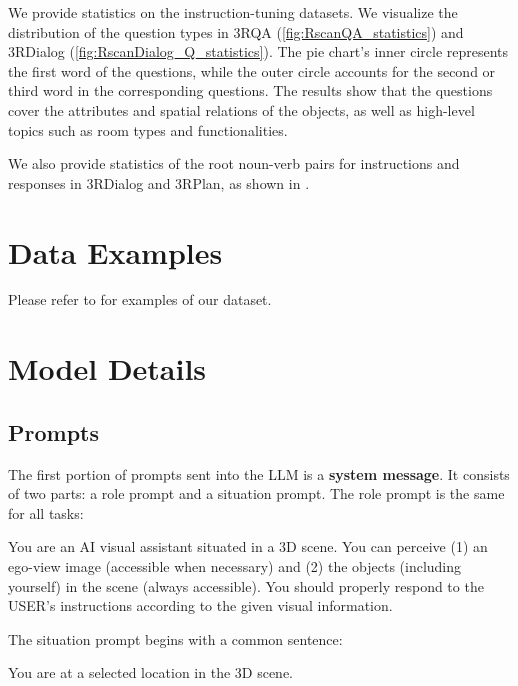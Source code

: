 We provide statistics on the instruction-tuning datasets. We visualize the distribution of the question types in 3RQA (\cref{fig:RscanQA_statistics}) and 3RDialog (\cref{fig:RscanDialog_Q_statistics}). The pie chart's inner circle represents the first word of the questions, while the outer circle accounts for the second or third word in the corresponding questions. The results show that the questions cover the attributes and spatial relations of the objects, as well as high-level topics such as room types and functionalities.

We also provide statistics of the root noun-verb pairs for instructions and responses in 3RDialog and 3RPlan, as shown in .

\section{Data Examples}\label{sec:supp_leo_ds_examples}
Please refer to  for examples of our dataset.

\section{Model Details}\label{app:model}
\subsection{Prompts}
The first portion of prompts sent into the LLM is a \textbf{system message}. It consists of two parts: a role prompt and a situation prompt. The role prompt is the same for all tasks:
\begin{tcolorbox}
\begin{minipage}{\linewidth}
You are an AI visual assistant situated in a 3D scene. You can perceive (1) an ego-view image (accessible when necessary) and (2) the objects (including yourself) in the scene (always accessible). You should properly respond to the USER's instructions according to the given visual information.
\end{minipage}
\end{tcolorbox}

The situation prompt begins with a common sentence:

\begin{tcolorbox}
\begin{minipage}{\linewidth}
You are at a selected location in the 3D scene.
\end{minipage}
\end{tcolorbox}

